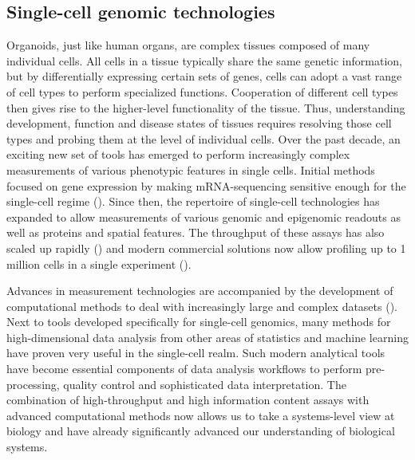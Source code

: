 \subsection{Single-cell genomic technologies}


Organoids, just like human organs, are complex tissues composed of many individual cells. All cells in a tissue typically share the same genetic information, but by differentially expressing certain sets of genes, cells can adopt a vast range of cell types to perform specialized functions. Cooperation of different cell types then gives rise to the higher-level functionality of the tissue. Thus, understanding development, function and disease states of tissues requires resolving those cell types and probing them at the level of individual cells. Over the past decade, an exciting new set of tools has emerged to perform increasingly complex measurements of various phenotypic features in single cells. Initial methods focused on gene expression by making mRNA-sequencing sensitive enough for the single-cell regime (\cite{tang_mrna-seq_2009}). Since then, the repertoire of single-cell technologies has expanded to allow measurements of various genomic and epigenomic readouts as well as proteins and spatial features. The throughput of these assays has also scaled up rapidly (\cite{svensson_exponential_2018}) and modern commercial solutions now allow profiling up to 1 million cells in a single experiment (\cite{srivatsan_massively_2020,mulqueen_high-content_2021}). 

Advances in measurement technologies are accompanied by the development of computational methods to deal with increasingly large and complex datasets (\cite{zappia_exploring_2018}). Next to tools developed specifically for single-cell genomics, many methods for high-dimensional data analysis from other areas of statistics and machine learning have proven very useful in the single-cell realm. Such modern analytical tools have become essential components of data analysis workflows to perform pre-processing, quality control and sophisticated data interpretation. The combination of high-throughput and high information content assays with advanced computational methods now allows us to take a systems-level view at biology and have already significantly advanced our understanding of biological systems.

